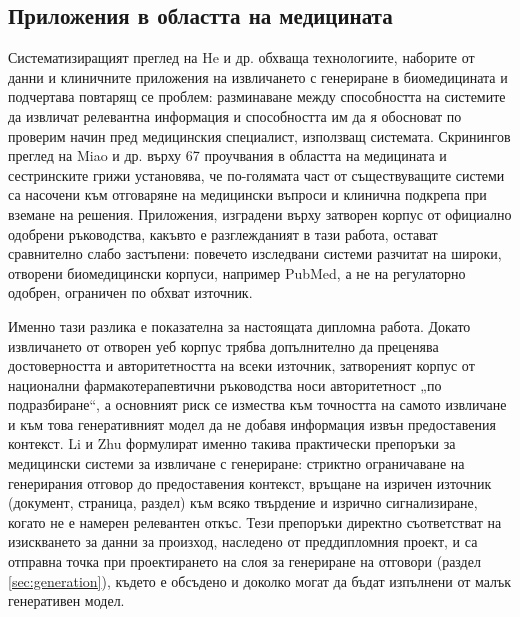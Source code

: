 \documentclass[12pt,a4paper]{article}
\begin{document}
\subsection{Приложения в областта на медицината}
Систематизиращият преглед на He и др. \cite{he2025biomedrag} обхваща технологиите, наборите от данни и клиничните приложения на извличането с генериране в биомедицината и подчертава повтарящ се проблем: разминаване между способността на системите да извличат релевантна информация и способността им да я обосноват по проверим начин пред медицинския специалист, използващ системата. Скринингов преглед на Miao и др. \cite{miao2025jmirnursing} върху 67 проучвания в областта на медицината и сестринските грижи установява, че по-голямата част от съществуващите системи са насочени към отговаряне на медицински въпроси и клинична подкрепа при вземане на решения. Приложения, изградени върху затворен корпус от официално одобрени ръководства, какъвто е разглежданият в тази работа, остават сравнително слабо застъпени: повечето изследвани системи разчитат на широки, отворени биомедицински корпуси, например PubMed, а не на регулаторно одобрен, ограничен по обхват източник.

Именно тази разлика е показателна за настоящата дипломна работа. Докато извличането от отворен уеб корпус трябва допълнително да преценява достоверността и авторитетността на всеки източник, затвореният корпус от национални фармакотерапевтични ръководства носи авторитетност „по подразбиране“, а основният риск се измества към точността на самото извличане и към това генеративният модел да не добавя информация извън предоставения контекст. Li и Zhu \cite{li2026medicalragindustry} формулират именно такива практически препоръки за медицински системи за извличане с генериране: стриктно ограничаване на генерирания отговор до предоставения контекст, връщане на изричен източник (документ, страница, раздел) към всяко твърдение и изрично сигнализиране, когато не е намерен релевантен откъс. Тези препоръки директно съответстват на изискването за данни за произход, наследено от преддипломния проект, и са отправна точка при проектирането на слоя за генериране на отговори (раздел \ref{sec:generation}), където е обсъдено и доколко могат да бъдат изпълнени от малък генеративен модел.
\end{document}
